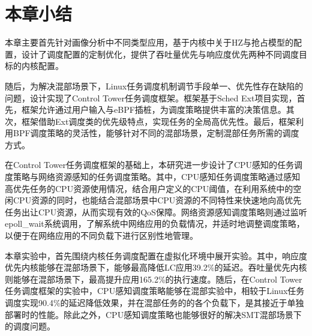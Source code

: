 \section{本章小结}

本章主要首先针对画像分析中不同类型应用，基于内核中关于HZ与抢占模型的配置，设计了调度配置的定制优化，提供了吞吐量优先与响应度优先两种不同调度目标的内核配置。

随后，为解决混部场景下，Linux任务调度机制调节手段单一、优先性存在缺陷的问题，设计实现了Control Tower任务调度框架。框架基于Sched Ext项目实现，首先，框架允许通过用户输入与eBPF插桩，为调度策略提供丰富的决策信息。其次，框架借助Ext调度类的优先级特点，实现任务的全局高优先性。最后，框架利用BPF调度策略的灵活性，能够针对不同的混部场景，定制混部任务所需的调度方式。

在Control Tower任务调度框架的基础上，本研究进一步设计了CPU感知的任务调度策略与网络资源感知的任务调度策略。其中，CPU感知任务调度策略通过感知高优先任务的CPU资源使用情况，结合用户定义的CPU阈值，在利用系统中的空闲CPU资源的同时，也能结合混部场景中CPU资源的不同特性来快速地向高优先任务出让CPU资源，从而实现有效的QoS保障。网络资源感知调度策略则通过监听epoll\_wait系统调用，了解系统中网络应用的负载情况，并适时地调整调度策略，以便于在网络应用的不同负载下进行区别性地管理。

本章实验中，首先围绕内核任务调度配置在虚拟化环境中展开实验。其中，响应度优先内核能够在混部场景下，能够最高降低LC应用39.2\%的延迟。吞吐量优先内核则能够在混部场景下，最高提升应用165.2\%的执行速度。随后，在Control Tower任务调度框架的实验中，CPU感知调度策略能够在混部实验中，相较于Linux任务调度实现90.4\%的延迟降低效果，并在混部任务的的各个负载下，是其接近于单独部署时的性能。除此之外，CPU感知调度策略也能够很好的解决SMT混部场景下的调度问题。